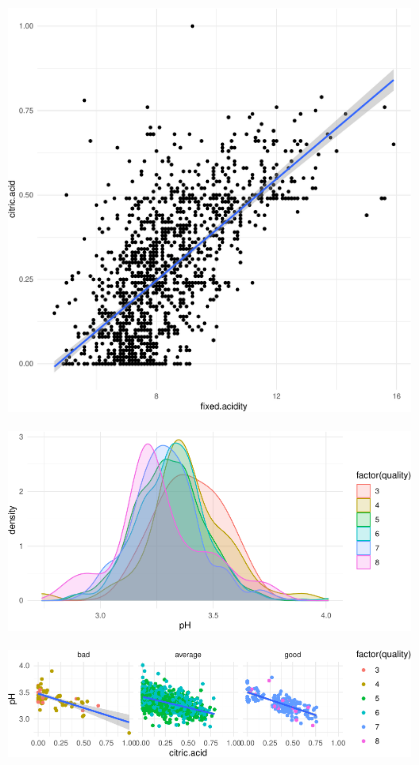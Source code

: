 \begin{frame}
\framebreak
 
\includegraphics[width=0.8\textwidth,height=0.7\textheight,keepaspectratio]{examples/ex-ggplot-08-crop.pdf}

\framebreak
 
\includegraphics[width=0.8\textwidth,height=0.7\textheight,keepaspectratio]{examples/ex-ggplot-09-crop.pdf}

\framebreak
 
\includegraphics[width=0.8\textwidth,height=0.7\textheight,keepaspectratio]{examples/ex-ggplot-10-crop.pdf}


\end{frame}
